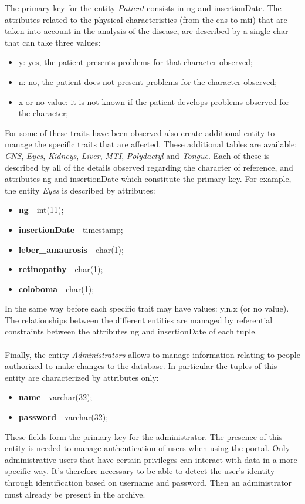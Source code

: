 \documentclass[a4paper]{report}
\begin{document}
The primary key for the entity \textit{Patient} consists in ng and insertionDate. The attributes related to the physical characteristics (from the cns to mti) that are taken into account in the analysis of the disease, are described  by a single char that can take three values:
\begin{itemize}
	\item y: yes, the patient presents problems for that character observed;
	\item n: no, the patient does not present problems for the character observed;
	\item x or no value: it is not known if the patient develops problems observed for the character;
\end{itemize}
For some of these traits have been observed also create additional entity to manage the specific traits that are affected. These additional tables are available: \textit{CNS}, \textit{Eyes}, \textit{Kidneys}, \textit{Liver}, \textit{MTI}, \textit{Polydactyl} and \textit{Tongue}. Each of these is described by all of the details observed regarding the character of reference, and attributes ng and insertionDate which constitute the primary key. For example, the entity \textit{Eyes} is described by attributes:
\begin{itemize}
	\item \textbf{ng}  -  int(11);
	\item \textbf{insertionDate} - timestamp;
	\item \textbf{leber\_amaurosis} - char(1);
	\item \textbf{retinopathy} - char(1);
	\item \textbf{coloboma} - char(1);
\end{itemize}
In the same way before each specific trait may have values: y,n,x (or no value). \\
The relationships between the different entities are managed by referential constraints between the attributes ng and insertionDate of each tuple.\\ \\
Finally, the entity \textit{Administrators} allows to manage information relating to people authorized to make changes to the database. In particular the tuples of this entity are characterized by attributes only:
\begin{itemize}
	\item \textbf{name}  - varchar(32);
	\item \textbf{password} - varchar(32);
\end{itemize}
These fields form the primary key for the administrator. The presence of this entity is needed to manage authentication of users when using the portal. Only administrative users that have certain privileges can interact with data in a more specific way. It's therefore necessary to be able to detect the user's identity through identification based on username and password. Then an administrator must already be present in the archive.
\end{document}
